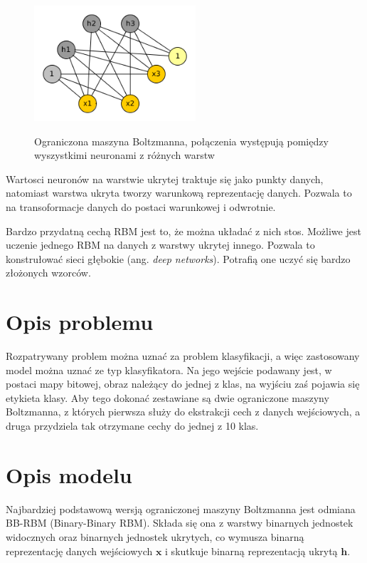 \documentclass[a4paper,10pt]{article} %
\begin{document}
\begin{figure}
 \centering
 \includegraphics[width=6cm]{imgs/rbm.png}
 \label{fig:rbm}
\caption{Ograniczona maszyna Boltzmanna, połączenia występują pomiędzy wyszystkimi neuronami z różnych
warstw}
\end{figure} 

Wartosci neuronów na warstwie ukrytej traktuje się jako punkty danych, natomiast warstwa ukryta tworzy
warunkową reprezentację danych. Pozwala to na transoformacje danych do postaci warunkowej i odwrotnie.

Bardzo przydatną cechą RBM jest to, że można układać z nich stos. Możliwe jest uczenie jednego RBM na
danych z warstwy ukrytej innego. Pozwala to konstrułować sieci głębokie (ang. \textit{deep networks}).
Potrafią one uczyć się bardzo złożonych wzorców.

\section{Opis problemu}

Rozpatrywany problem można uznać za problem klasyfikacji, a więc zastosowany model można uznać ze typ klasyfikatora. Na jego wejście podawany jest, w postaci mapy bitowej, obraz należący do jednej z klas, na wyjściu zaś pojawia się etykieta klasy. Aby tego dokonać zestawiane są dwie ograniczone maszyny Boltzmanna, z których pierwsza służy do ekstrakcji cech z danych wejściowych, a druga przydziela tak otrzymane cechy do jednej z 10 klas.

\section{Opis modelu}

Najbardziej podstawową wersją ograniczonej maszyny Boltzmanna jest odmiana BB-RBM (Binary-Binary RBM). Składa się ona z warstwy binarnych jednostek widocznych oraz binarnych jednostek ukrytych, co wymusza binarną reprezentację danych wejściowych $\mathbf{x}$ i skutkuje binarną reprezentacją ukrytą $\mathbf{h}$.
\end{document}
